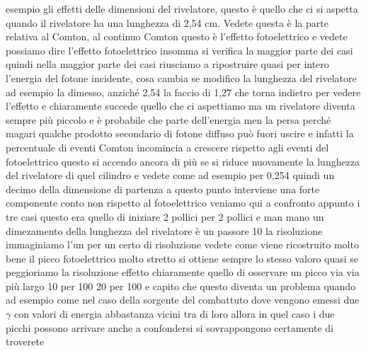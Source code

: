 {esempio gli effetti delle dimensioni del rivelatore, questo è quello che ci si aspetta quando il rivelatore ha una lunghezza di 2,54 cm. Vedete questa è la parte relativa al Comton, al continuo Comton questo è l'effetto fotoelettrico e vedete possiamo dire l'effetto fotoelettrico insomma si verifica la maggior parte dei casi quindi nella maggior parte dei casi riusciamo a ripostruire quasi per intero l'energia del fotone incidente, cosa cambia se modifico la lunghezza del rivelatore ad esempio la dimesso, anziché 2,54 la faccio di 1,27 che torna indietro per vedere l'effetto e chiaramente succede quello che ci aspettiamo ma un rivelatore diventa sempre più piccolo e è probabile che parte dell'energia men la persa perché magari qualche prodotto secondario di fotone diffuso può fuori uscire e infatti la percentuale di eventi Comton incomincia a crescere rispetto agli eventi del fotoelettrico questo si accendo ancora di più se si riduce nuovamente la lunghezza del rivelatore di quel cilindro e vedete come ad esempio per 0,254 quindi un decimo della dimensione di partenza a questo punto interviene una forte componente conto non rispetto al fotoelettrico veniamo qui a confronto appunto i tre casi questo era quello di iniziare 2 pollici per 2 pollici e man mano un dimezamento della lunghezza del rivelatore è un passore 10 la risoluzione immaginiamo l'un per un certo di risoluzione vedete come viene ricostruito molto bene il picco fotoelettrico molto stretto si ottiene sempre lo stesso valoro quasi se peggioriamo la risoluzione effetto chiaramente quello di osservare un picco via via più largo 10 per 100 20 per 100 e capito che questo diventa un problema quando ad esempio come nel caso della sorgente del combattuto dove vengono emessi due $\gamma$ con valori di energia abbastanza vicini tra di loro allora in quel caso i due picchi possono arrivare anche a confondersi si sovrappongono certamente di troverete 

}
